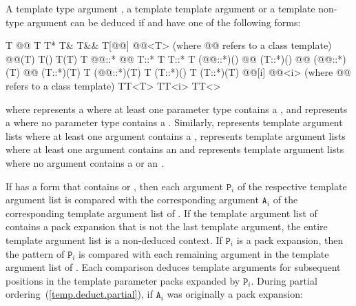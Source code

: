 \pnum
A template type argument
,
a template template argument
or a template non-type argument
can be deduced if
and
have one of the following forms:

\begin{codeblock}
T
@@ T
T*
T&
T&&
T[@@]
@@<T>  (where @@ refers to a class template)
@@(T)
T()
T(T)
T @@::*
@@ T::*
T T::*
T (@@::*)()
@@ (T::*)()
@@ (@@::*)(T)
@@ (T::*)(T)
T (@@::*)(T)
T (T::*)()
T (T::*)(T)
@@[i]
@@<i>  (where @@ refers to a class template)
TT<T>
TT<i>
TT<>
\end{codeblock}

where
represents
a 
where at least one parameter type contains a
,
and
\tcode{()}
represents
a 
where no parameter type contains a
.
Similarly,
represents template argument lists where at least one argument contains a
,
represents template argument lists where at least one argument contains an
and
\tcode{<>}
represents template argument lists where no argument contains a
or an
.

\pnum
If  has a form that contains 
or , then each argument $\mathtt{P}_i$ of the
respective template argument list  is compared with the
corresponding argument $\mathtt{A}_i$ of the corresponding
template argument list of . If the template argument list
of  contains a pack expansion that is not the last
template argument, the entire template argument list is a non-deduced
context. If $\texttt{P}_i$ is a pack expansion, then the pattern
of $\texttt{P}_i$ is compared with each remaining argument in the
template argument list of . Each comparison deduces
template arguments for subsequent positions in the template parameter
packs expanded by $\texttt{P}_i$.
During partial ordering~(\ref{temp.deduct.partial}), if $\texttt{A}_i$ was
originally a pack expansion:

